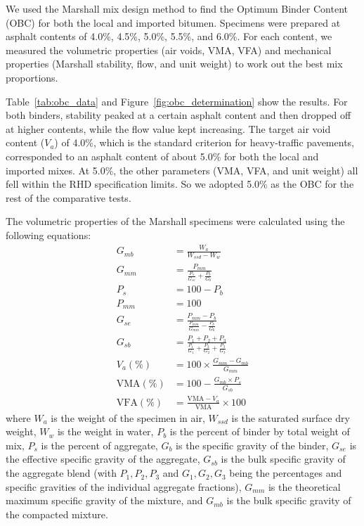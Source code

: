 \documentclass[12pt,a4paper]{article}
\begin{document}
We used the Marshall mix design method to find the Optimum Binder Content (OBC) for both the local and imported bitumen. Specimens were prepared at asphalt contents of 4.0\%, 4.5\%, 5.0\%, 5.5\%, and 6.0\%. For each content, we measured the volumetric properties (air voids, VMA, VFA) and mechanical properties (Marshall stability, flow, and unit weight) to work out the best mix proportions.

Table~\ref{tab:obc_data} and Figure~\ref{fig:obc_determination} show the results. For both binders, stability peaked at a certain asphalt content and then dropped off at higher contents, while the flow value kept increasing. The target air void content ($V_a$) of 4.0\%, which is the standard criterion for heavy-traffic pavements, corresponded to an asphalt content of about 5.0\% for both the local and imported mixes. At 5.0\%, the other parameters (VMA, VFA, and unit weight) all fell within the RHD specification limits. So we adopted 5.0\% as the OBC for the rest of the comparative tests.

The volumetric properties of the Marshall specimens were calculated using the following equations:
\begin{align}
    G_{mb} &= \frac{W_a}{W_{ssd} - W_w} \\
    G_{mm} &= \frac{P_{mm}}{\frac{P_s}{G_{se}} + \frac{P_b}{G_b}} \\
    P_s &= 100 - P_b \\
    P_{mm} &= 100 \\
    G_{se} &= \frac{P_{mm} - P_b}{\frac{P_{mm}}{G_{mm}} - \frac{P_b}{G_b}} \\
    G_{sb} &= \frac{P_1 + P_2 + P_3}{\frac{P_1}{G_1} + \frac{P_2}{G_2} + \frac{P_3}{G_3}} \\
    V_a (\%) &= 100 \times \frac{G_{mm} - G_{mb}}{G_{mm}} \\
    \text{VMA} (\%) &= 100 - \frac{G_{mb} \times P_s}{G_{sb}} \\
    \text{VFA} (\%) &= \frac{\text{VMA} - V_a}{\text{VMA}} \times 100
\end{align}
where $W_a$ is the weight of the specimen in air, $W_{ssd}$ is the saturated surface dry weight, $W_w$ is the weight in water, $P_b$ is the percent of binder by total weight of mix, $P_s$ is the percent of aggregate, $G_b$ is the specific gravity of the binder, $G_{se}$ is the effective specific gravity of the aggregate, $G_{sb}$ is the bulk specific gravity of the aggregate blend (with $P_1, P_2, P_3$ and $G_1, G_2, G_3$ being the percentages and specific gravities of the individual aggregate fractions), $G_{mm}$ is the theoretical maximum specific gravity of the mixture, and $G_{mb}$ is the bulk specific gravity of the compacted mixture.
\end{document}

